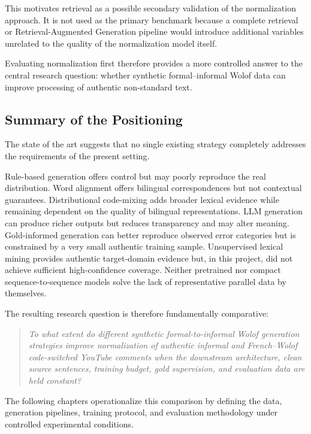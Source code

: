 \documentclass[12pt, a4paper, twoside, openany]{report}
\begin{document}
This motivates retrieval as a possible secondary validation of the normalization approach. It is not used as the primary benchmark because a complete retrieval or Retrieval-Augmented Generation pipeline would introduce additional variables unrelated to the quality of the normalization model itself.

Evaluating normalization first therefore provides a more controlled answer to the central research question: whether synthetic formal--informal Wolof data can improve processing of authentic non-standard text.


\subsection{Summary of the Positioning}

The state of the art suggests that no single existing strategy completely addresses the requirements of the present setting.

Rule-based generation offers control but may poorly reproduce the real distribution. Word alignment offers bilingual correspondences but not contextual guarantees. Distributional code-mixing adds broader lexical evidence while remaining dependent on the quality of bilingual representations. LLM generation can produce richer outputs but reduces transparency and may alter meaning. Gold-informed generation can better reproduce observed error categories but is constrained by a very small authentic training sample. Unsupervised lexical mining provides authentic target-domain evidence but, in this project, did not achieve sufficient high-confidence coverage. Neither pretrained nor compact sequence-to-sequence models solve the lack of representative parallel data by themselves.

The resulting research question is therefore fundamentally comparative:

\begin{quote}
	\textit{To what extent do different synthetic formal-to-informal Wolof generation strategies improve normalization of authentic informal and French--Wolof code-switched YouTube comments when the downstream architecture, clean source sentences, training budget, gold supervision, and evaluation data are held constant?}
\end{quote}

The following chapters operationalize this comparison by defining the data, generation pipelines, training protocol, and evaluation methodology under controlled experimental conditions.
\end{document}
